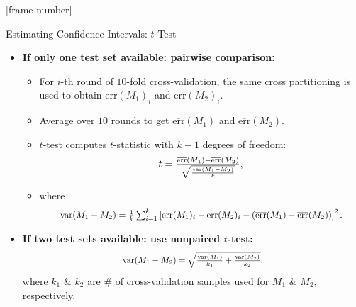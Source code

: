 \documentclass[aspectratio=169,t,table]{beamer}
\begin{document}
  {
    [frame number]
    \begin{frame}{Estimating Confidence Intervals: $t$-Test}
      \begin{itemize}
        \item \textbf{If only one test set available: pairwise comparison:}
        \begin{itemize}
          \item For $i$-th round of $10$-fold cross-validation, the same cross partitioning is used to obtain $\text{err}(M_1)_i$ and $\text{err}(M_2)_i$.
          \item Average over $10$ rounds to get $\overline{\text{err}}(M_1)$ and $\overline{\text{err}}(M_2)$.
          \item $t$-test computes $t$-statistic with $k-1$ degrees of freedom:
                \begin{align}
                  \resizebox{3cm}{!}{%
                  $t = \frac{\overline{\text{err}}(M_1)- \overline{\text{err}}(M_2)}{\sqrt{\frac{\text{var}(M_1-M_2)}{k}}},$}
                \end{align}
          \item where
                \begin{align}
                  \resizebox{10cm}{!}{%
                  $\text{var}(M_1-M_2) = \frac{1}{k} \sum_{i=1}^{k} \left[ \text{err}(M_1)_i - \text{err}(M_2)_i - (\overline{\text{err}}(M_1) - \overline{\text{err}}(M_2))\right]^2.$}
                \end{align}
        \end{itemize}
        \item \textbf{If two test sets available: use nonpaired $t$-test:}
              \begin{align}
                \resizebox{5cm}{!}{%
                $\text{var}(M_1-M_2) = \sqrt{\frac{\text{var}(M_1)}{k_1} + \frac{\text{var}(M_2)}{k_2}},$}
              \end{align}
              where $k_1$ \& $k_2$ are $\#$ of cross-validation samples used for $M_1$ \& $M_2$, respectively.
      \end{itemize}
    \end{frame}
  }
\end{document}
